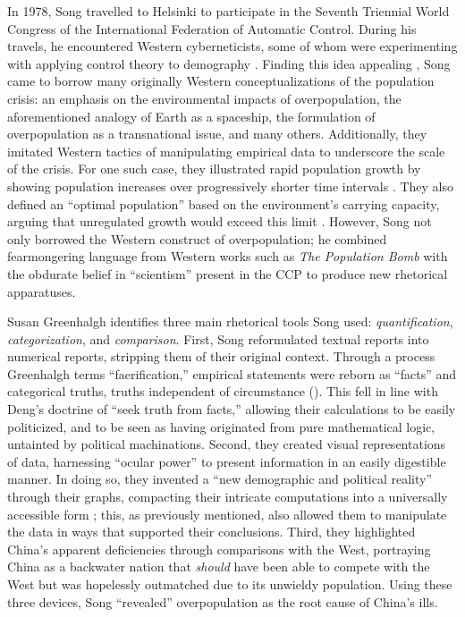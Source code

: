 \documentclass[12pt, a4paper, twoside]{article}
\begin{document}
In 1978, Song travelled to Helsinki to participate in the Seventh Triennial World Congress of the International Federation of Automatic Control. During his travels, he encountered Western cyberneticists, some of whom were experimenting with applying control theory to demography \autocite[p.\ 142]{Bacaer2011}. Finding this idea appealing \autocite[p.\ 144]{Greenhalgh2008JustOneChild}, Song came to borrow many originally Western conceptualizations of the population crisis: an emphasis on the environmental impacts of overpopulation, the aforementioned analogy of Earth as a spaceship, the formulation of overpopulation as a transnational issue, and many others. Additionally, they imitated Western tactics of manipulating empirical data to underscore the scale of the crisis. For one such case, they illustrated rapid population growth by showing population increases over progressively shorter time intervals \autocite[pp.\ 6--7]{Goldsmith1972}. They also defined an “optimal population” based on the environment's carrying capacity, arguing that unregulated growth would exceed this limit \autocite[pp.\ 46--47]{Goldsmith1972}. However, Song not only borrowed the Western construct of overpopulation; he combined fearmongering language from Western works such as \emph{The Population Bomb} with the obdurate belief in “scientism” present in the CCP to produce new rhetorical apparatuses.

Susan Greenhalgh identifies three main rhetorical tools Song used: \emph{quantification}, \emph{categorization}, and \emph{comparison}. First, Song reformulated textual reports into numerical reports, stripping them of their original context. Through a process Greenhalgh terms “faerification,” empirical statements were reborn as “facts” and categorical truths, truths independent of circumstance (\cites[p.\ 109]{Greenhalgh2008JustOneChild}[p.\ 23]{Latour1987}). This fell in line with Deng’s doctrine of “seek truth from facts,” allowing their calculations to be easily politicized, and to be seen as having originated from pure mathematical logic, untainted by political machinations. Second, they created visual representations of data, harnessing “ocular power” to present information in an easily digestible manner. In doing so, they invented a “new demographic and political reality” through their graphs, compacting their intricate computations into a universally accessible form \autocite[p.\ 110]{Greenhalgh2008JustOneChild}; this, as previously mentioned, also allowed them to manipulate the data in ways that supported their conclusions. Third, they highlighted China’s apparent deficiencies through comparisons with the West, portraying China as a backwater nation that \emph{should} have been able to compete with the West but was hopelessly outmatched due to its unwieldy population. Using these three devices, Song “revealed” overpopulation as the root cause of China’s ills.
\end{document}
